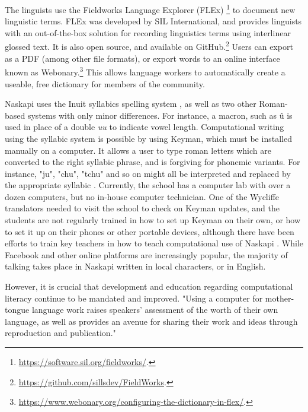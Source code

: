 The linguists use the Fieldworks Language Explorer (FLEx) \footnote{\href{https://software.sil.org/fieldworks/}{https://software.sil.org/fieldworks/}. } to document new linguistic terms. FLEx was developed by SIL International, and provides linguists with an out-of-the-box solution for recording linguistics terms using interlinear glossed text. It is also open source, and available on GitHub.\footnote{\href{https://github.com/sillsdev/FieldWorks}{https://github.com/sillsdev/FieldWorks}. } Users can export as a PDF (among other file formats), or export words to an online interface known as Webonary.\footnote{\href{https://www.webonary.org/configuring-the-dictionary-in-flex/}{https://www.webonary.org/configuring-the-dictionary-in-flex/}. } This allows language workers to automatically create a useable, free dictionary for members of the community.

Naskapi uses the Inuit syllabics spelling system \cite{wals-141}, as well as two other Roman-based systems with only minor differences. For instance, a macron, such as \^u is used in place of a double \emph{uu} to indicate vowel length. Computational writing using the syllabic system is possible by using Keyman, which must be installed manually on a computer. It allows a user to type roman letters which are converted to the right syllabic phrase, and is forgiving for phonemic variants. For instance, "ju", "chu", "tchu" and so on might all be interpreted and replaced by the appropriate syllabic . %
Currently, the school has a computer lab with over a dozen computers, but no in-house computer technician. One of the Wycliffe translators needed to visit the school to check on Keyman updates, and the students are not regularly trained in how to set up Keyman on their own, or how to set it up on their phones or other portable devices, although there have been efforts to train key teachers in how to teach computational use of Naskapi \citep{jancewicz1998developing}. While Facebook and other online platforms are increasingly popular, the majority of talking takes place in Naskapi written in local characters, or in English.

However, it is crucial that development and education regarding computational literacy continue to be mandated and improved. "Using a computer for mother-tongue language work raises speakers' assessment of the worth of their own language, as well as provides an avenue for sharing their work and ideas through reproduction and publication." \citet{jancewicz2002applied}

